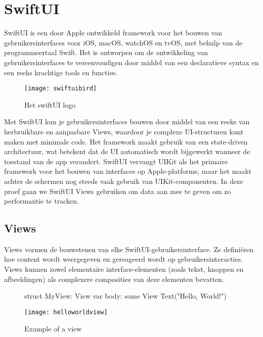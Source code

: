 \section{SwiftUI}
\autocite{AppleSwiftUI} SwiftUI is een door Apple ontwikkeld framework voor het bouwen van gebruikersinterfaces voor iOS, macOS, watchOS en tvOS, met behulp van de programmeertaal Swift. Het is ontworpen om de ontwikkeling van gebruikersinterfaces te vereenvoudigen door middel van een declaratieve syntax en een reeks krachtige tools en functies. 
\begin{wrapfigure}{r}{0.3\textwidth}
    \texttt{[image: swiftuibird]} 
    \caption{Het swiftUI logo \autocite{SwiftUiImage}}
    \label{fig:swiftUI}
\end{wrapfigure}
Met SwiftUI kun je gebruikersinterfaces bouwen door middel van een reeks van herbruikbare en aanpasbare Views, waardoor je complexe UI-structuren kunt maken met minimale code. Het framework maakt gebruik van een state-driven architectuur, wat betekent dat de UI automatisch wordt bijgewerkt wanneer de toestand van de app verandert. SwiftUI vervangt UIKit als het primaire framework voor het bouwen van interfaces op Apple-platforms, maar het maakt achter de schermen nog steeds vaak gebruik van UIKit-componenten. In deze proef gaan we SwiftUI Views gebruiken om data aan mee te geven om zo performantie te tracken.


\subsection{Views}
\autocite{AppleSwiftViews} Views vormen de bouwstenen van elke SwiftUI-gebruikersinterface. Ze definiëren hoe content wordt weergegeven en gereageerd wordt op gebruikersinteracties. Views kunnen zowel elementaire interface-elementen (zoals tekst, knoppen en afbeeldingen) als complexere composities van deze elementen bevatten.

\begin{figure}[h]
    \begin{minipage}{0.5\textwidth}
        \begin{swift}[caption=Example of a view, label=view_example]
           struct MyView: View {
               var body: some View {
                   Text("Hello, World!")
               }
           }
        \end{swift}
    \end{minipage}%
    \hfill
    \begin{minipage}{0.45\textwidth}
        \centering
        \texttt{[image: helloworldview]}
        \caption{Example of a view}
        \label{fig:viewex1}
    \end{minipage}
\end{figure}

